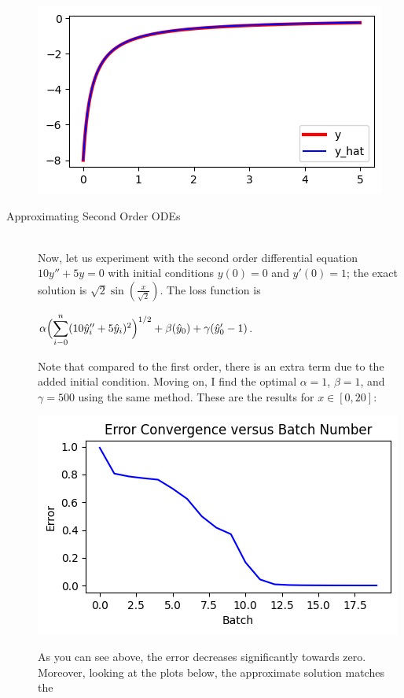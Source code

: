 \documentclass[12pt]{article}
\newcommand{\dsum}[2]{\mathlarger{\sum}_{#1}^{#2}}
\newcommand{\bgc}{\begin{center}}
\newcommand{\enc}{\end{center}}
\begin{document}
\begin{description}
\begin{minipage}{\linewidth}
        \includegraphics[scale=.5]{images/figure8.png}
    \end{minipage}

    \item[Approximating Second Order ODEs] \hfill \\
    Now, let us experiment with the second order differential equation $10y''+
    5y = 0$ with initial conditions  $y(0) = 0$ and $y'(0) = 1$; the exact
    solution is $\sqrt{2}\sin(\frac{x}{\sqrt{2}})$. The loss function is 
    \bgc 
    $\alpha\Bigl(\dsum{i-0}{n}(10\hat{y}_i'' + 5\hat{y}_i)^2\Bigr)^{1/2} 
    + \beta(\hat{y}_0)
    + \gamma(\hat{y}_0' - 1)$.
    \enc
    Note that compared to the first order, there is an extra term due to the
    added initial condition. Moving on, I find the optimal $\alpha = 1$, $\beta
    = 1$, and $\gamma = 500$ using the same method. These are the results
    for $x\in[0, 20]$: \\
    \begin{minipage}{\linewidth}
        \centering
        \includegraphics[scale=.5]{images/figure9.png}
    \end{minipage}
    As you can see above, the error decreases significantly towards zero.
    Moreover, looking at the plots below, the approximate solution matches the

\end{description}
\end{document}
